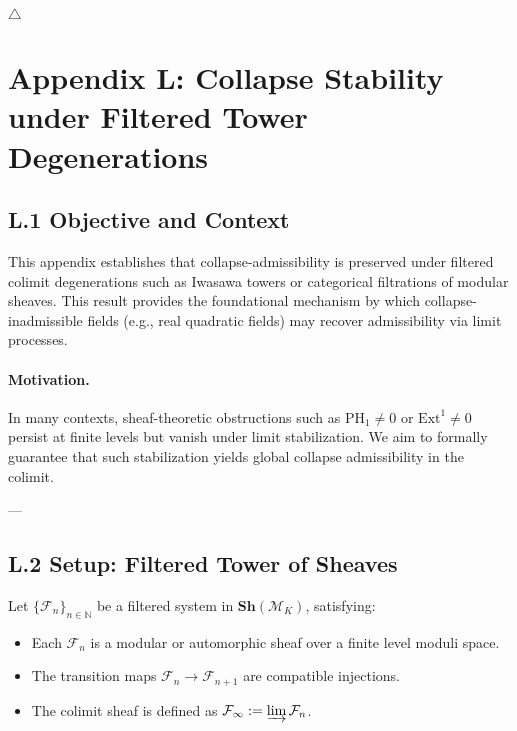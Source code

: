 \documentclass[11pt]{article}
\begin{document}
\hfill $\triangle$



\appendix
\section*{Appendix L: Collapse Stability under Filtered Tower Degenerations}

\subsection*{L.1 Objective and Context}

This appendix establishes that collapse-admissibility is preserved under filtered colimit degenerations such as Iwasawa towers or categorical filtrations of modular sheaves. This result provides the foundational mechanism by which collapse-inadmissible fields (e.g., real quadratic fields) may recover admissibility via limit processes.

\medskip

\paragraph{Motivation.}  
In many contexts, sheaf-theoretic obstructions such as \( \mathrm{PH}_1 \ne 0 \) or \( \mathrm{Ext}^1 \ne 0 \) persist at finite levels but vanish under limit stabilization. We aim to formally guarantee that such stabilization yields global collapse admissibility in the colimit.

---

\subsection*{L.2 Setup: Filtered Tower of Sheaves}

Let \( \{ \mathcal{F}_n \}_{n \in \mathbb{N}} \) be a filtered system in \( \mathbf{Sh}(\mathcal{M}_K) \), satisfying:
\begin{itemize}
  \item Each \( \mathcal{F}_n \) is a modular or automorphic sheaf over a finite level moduli space.
  \item The transition maps \( \mathcal{F}_n \to \mathcal{F}_{n+1} \) are compatible injections.
  \item The colimit sheaf is defined as \( \mathcal{F}_\infty := \varinjlim \mathcal{F}_n \).
\end{itemize}
\end{document}
